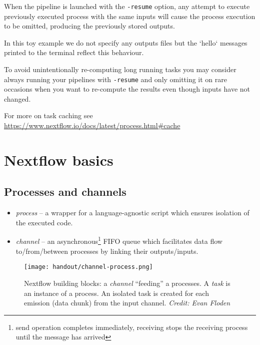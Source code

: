 \begin{note}
When the pipeline is launched with the \texttt{-resume} option, 
any attempt to execute previously executed process with the same inputs
will cause the process execution to be omitted, 
producing the previously stored outputs.

In this toy example we do not specify any outputs files
but the `hello` messages printed to the terminal 
reflect this behaviour.



To avoid unintentionally re-computing long running tasks you may consider 
always running your pipelines with \texttt{-resume} and only omitting it
on rare occasions when you want to re-compute the results
even though inputs have not changed. 

For more on task caching see \url{https://www.nextflow.io/docs/latest/process.html#cache}

\end{note}
\newpage

\section{Nextflow basics}

\subsection{Processes and channels}


\begin{itemize}
\item \emph{process} -- a wrapper for a language-agnostic script which ensures isolation of the executed code.
\item \emph{channel} -- an asynchronous\footnote{send operation completes immediately, receiving stops the receiving process until the message has arrived} FIFO queue which facilitates data flow to/from/between processes by linking their outputs/inputs.
\end{itemize}


\begin{figure}[H]
\centering
\texttt{[image: handout/channel-process.png]}
\caption{Nextflow building blocks: a \emph{channel} ``feeding'' a processes. 
A \emph{task} is an instance of a process. An isolated task is created for each emission (data chunk) from the input channel. \emph{Credit: Evan Floden}}
\label{fig:proc-chn}
\end{figure}


